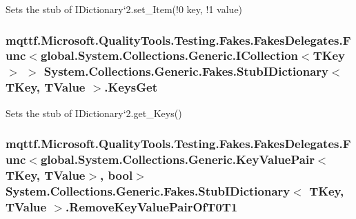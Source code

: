 Sets the stub of I\-Dictionary`2.set\-\_\-\-Item(!0 key, !1 value)

\hypertarget{class_system_1_1_collections_1_1_generic_1_1_fakes_1_1_stub_i_dictionary_3_01_t_key_00_01_t_value_01_4_acca6cc891ade76fa2bffa664d552d3fe}{
\subsubsection[{Keys\-Get}]{\setlength{\rightskip}{0pt plus 5cm}mqttf.\-Microsoft.\-Quality\-Tools.\-Testing.\-Fakes.\-Fakes\-Delegates.\-Func$<$global.\-System.\-Collections.\-Generic.\-I\-Collection$<$T\-Key$>$ $>$ System.\-Collections.\-Generic.\-Fakes.\-Stub\-I\-Dictionary$<$ T\-Key, T\-Value $>$.Keys\-Get}}\label{class_system_1_1_collections_1_1_generic_1_1_fakes_1_1_stub_i_dictionary_3_01_t_key_00_01_t_value_01_4_acca6cc891ade76fa2bffa664d552d3fe}


Sets the stub of I\-Dictionary`2.get\-\_\-\-Keys()

\hypertarget{class_system_1_1_collections_1_1_generic_1_1_fakes_1_1_stub_i_dictionary_3_01_t_key_00_01_t_value_01_4_a00f3d0d0e92599c951a8aa1f05a9cc35}{
\subsubsection[{Remove\-Key\-Value\-Pair\-Of\-T0\-T1}]{\setlength{\rightskip}{0pt plus 5cm}mqttf.\-Microsoft.\-Quality\-Tools.\-Testing.\-Fakes.\-Fakes\-Delegates.\-Func$<$global.\-System.\-Collections.\-Generic.\-Key\-Value\-Pair$<$T\-Key, T\-Value$>$, bool$>$ System.\-Collections.\-Generic.\-Fakes.\-Stub\-I\-Dictionary$<$ T\-Key, T\-Value $>$.Remove\-Key\-Value\-Pair\-Of\-T0\-T1}}\label{class_system_1_1_collections_1_1_generic_1_1_fakes_1_1_stub_i_dictionary_3_01_t_key_00_01_t_value_01_4_a00f3d0d0e92599c951a8aa1f05a9cc35}


